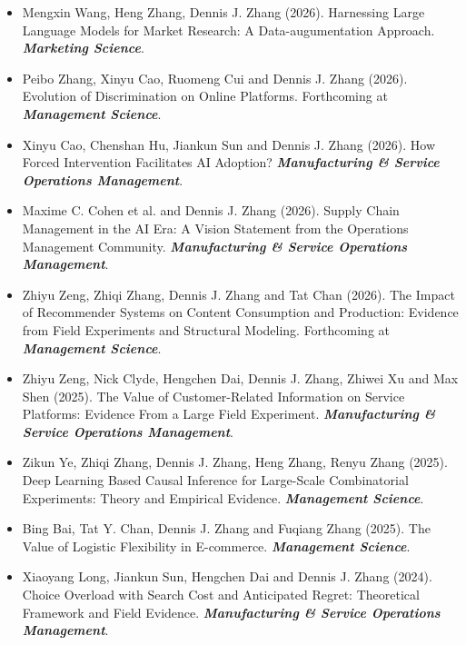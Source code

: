 \documentclass[10pt]{article}
\begin{document}
\begin{itemize}

    \item Mengxin Wang, Heng Zhang, Dennis J. Zhang (2026). Harnessing Large Language Models for Market Research: A Data-augumentation Approach. \emph{\bf Marketing Science}.

    \item Peibo Zhang, Xinyu Cao, Ruomeng Cui and Dennis J. Zhang (2026). Evolution of Discrimination on Online Platforms. Forthcoming at \emph{\bf Management Science}.

    \item Xinyu Cao, Chenshan Hu, Jiankun Sun and Dennis J. Zhang (2026). How Forced Intervention Facilitates AI Adoption? \emph{\bf Manufacturing \& Service Operations Management}.

    \item Maxime C. Cohen et al. and Dennis J. Zhang (2026). Supply Chain Management in the AI Era: A Vision Statement from the Operations Management Community. \emph{\bf Manufacturing \& Service Operations Management}.

    \item Zhiyu Zeng, Zhiqi Zhang, Dennis J. Zhang and Tat Chan (2026). The Impact of Recommender Systems on Content Consumption and Production: Evidence from Field Experiments and Structural Modeling. Forthcoming at \emph{\bf Management Science}.

    \item Zhiyu Zeng, Nick Clyde, Hengchen Dai, Dennis J. Zhang, Zhiwei Xu and Max Shen (2025). The Value of Customer-Related Information on Service Platforms: Evidence From a Large Field Experiment. \emph{\bf Manufacturing \& Service Operations Management}.


    \item Zikun Ye, Zhiqi Zhang, Dennis J. Zhang, Heng Zhang, Renyu Zhang (2025). Deep Learning Based Causal Inference for Large-Scale Combinatorial Experiments: Theory and Empirical Evidence. \emph{\bf Management Science}.

    \item Bing Bai, Tat Y. Chan, Dennis J. Zhang and Fuqiang Zhang (2025). The Value of Logistic Flexibility in E-commerce. \emph{\bf Management Science}.

    \item Xiaoyang Long, Jiankun Sun, Hengchen Dai and Dennis J. Zhang (2024). Choice Overload with Search Cost and Anticipated Regret: Theoretical Framework and Field Evidence. \emph{\bf Manufacturing \& Service Operations Management}.



\end{itemize}
\end{document}
